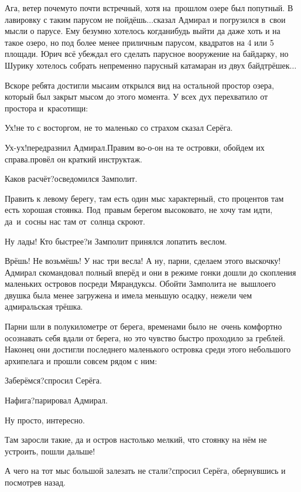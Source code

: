 \diagdash Ага, ветер почему\sdash то почти встречный, хотя на~прошлом озере был попутный. В лавировку с таким парусом не пойдёшь$\ldots$\mdash сказал Адмирал и погрузился в~свои мысли о парусе. Ему безумно хотелось когда\sdash нибудь выйти да даже хоть и на такое озеро, но под более менее приличным парусом, квадратов на 4 или 5 площади. Юрич всё убеждал его сделать парусное вооружение на байдарку, но Шурику хотелось собрать непременно парусный катамаран из двух байд\sdash трёшек$\ldots$

Вскоре ребята достигли мыса\mdash им открылся вид на остальной простор озера, который был закрыт мысом до этого момента. У всех дух перехватило от простора и~красотищи:

\diagdash Ух!\mdash не то с восторгом, не то маленько со страхом сказал Серёга.

\diagdash Ух-ух!\mdash передразнил Адмирал.\mdash Правим во-о-он на те островки, обойдем их справа.\mdash провёл он краткий инструктаж.

\diagdash Каков расчёт?\mdash осведомился Замполит.

\diagdash Править к левому берегу, там есть один мыс характерный, сто процентов там есть хорошая стоянка. Под~правым берегом высоковато, не хочу там идти, да~и~сосны нас там от~солнца скроют.

\diagdash Ну лады! Кто быстрее?\mdash и Замполит принялся лопатить веслом.

\diagdash Врёшь! Не возьмёшь! У нас три весла! А ну, парни, сделаем этого выскочку!\mdash Адмирал скомандовал полный вперёд и они в режиме гонки дошли до скопления маленьких островов посреди Мярандуксы. Обойти Замполита не~вышло\mdash его двушка была менее загружена и имела меньшую осадку, нежели чем адмиральская трёшка. 

Парни шли в полукилометре от берега, временами было не~очень комфортно осознавать себя вдали от берега, но это чувство быстро проходило за греблей. Наконец они достигли последнего маленького островка среди этого небольшого архипелага и прошли совсем рядом с ним:

\diagdash Заберёмся?\mdash спросил Серёга.

\diagdash Нафига?\mdash парировал Адмирал.

\diagdash Ну просто, интересно.

\diagdash Там заросли такие, да и остров настолько мелкий, что стоянку на нём не устроить, пошли дальше!

\diagdash А чего на тот мыс большой залезать не стали?\mdash спросил Серёга, обернувшись и посмотрев назад.

